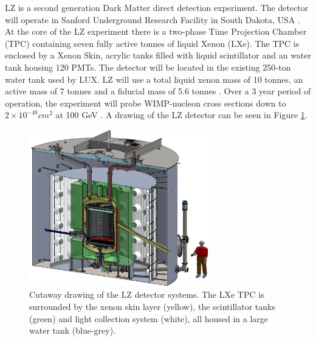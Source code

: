 LZ is a second generation Dark Matter direct detection experiment. The detector will operate in Sanford Underground Research Facility in South Dakota, USA \cite{SURF}. At the core of the LZ experiment there is a two-phase Time Projection Chamber (TPC) containing seven fully active tonnes of liquid Xenon (LXe). The TPC is enclosed by a Xenon Skin, acrylic tanks filled with liquid scintillator and an water tank housing 120 PMTs. The detector will be located in the existing 250-ton water tank used by LUX. LZ will use a total liquid xenon mass of 10 tonnes, an active mass of 7 tonnes and a fiducial mass of 5.6 tonnes \cite{LZTDR}. Over a 3 year period of operation, the experiment will probe WIMP-nucleon cross sections down to $2 \times 10^{-48} cm^2$ at 100 GeV \cite{LZIntro}. A drawing of the LZ detector can be seen in Figure \ref{fig:LZDetector}. 
\begin{figure}[h]
\centering
\includegraphics[width=0.7\textwidth]{Figures/Detector_design.jpg}
\caption{Cutaway drawing of the LZ detector systems. The LXe TPC is surrounded by the xenon skin layer (yellow), the scintillator tanks (green) and light collection system (white), all housed in a large water tank (blue-grey).\cite{LZTDR}}
\label{fig:LZDetector}
\end{figure}

